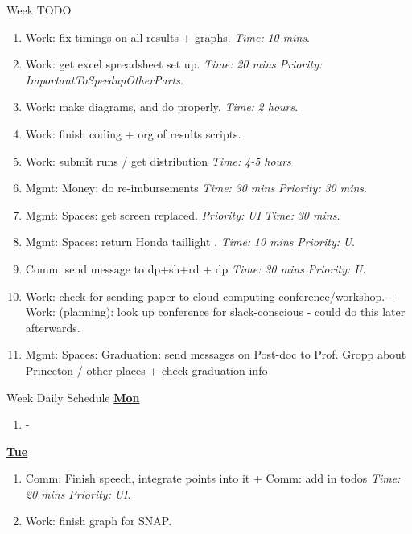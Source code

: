 \documentclass[serif, mathserif, final]{beamer}
\newcommand{\timeEst}[1]{\textit{Time:} \textit{#1}}
\newcommand{\priority}[1]{\textit{Priority:} \textit{#1}}
\begin{document}
\begin{frame}{}
\begin{columns}
\begin{column}{0.50\linewidth}
\begin{block}{Week TODO}
\begin{enumerate}
    \item \tiny Work: fix timings on all results + graphs. \timeEst{10 mins}. 
    \item \tiny Work: get excel spreadsheet set up. \timeEst{20 mins} \priority{ImportantToSpeedupOtherParts}. 

    \item \tiny Work: make diagrams, and do properly. \timeEst{2 hours}.  
    \item \tiny Work: finish coding + org of results scripts.
      \tiny \item \tiny Work: submit runs / get distribution \timeEst{4-5 hours}
    \item \tiny Mgmt: Money: do re-imbursements \timeEst{30 mins} \priority{30 mins}. 
    \item \tiny Mgmt: Spaces: get screen replaced. \priority{UI} \timeEst{30 mins}. 
    \item \tiny Mgmt: Spaces: return Honda taillight . \timeEst{10 mins} \priority{U}. 
    \item \tiny Comm: send message to dp+sh+rd   + dp \timeEst{30 mins} \priority{U}. 
    \item \tiny Work: check for sending paper to cloud computing
      conference/workshop. +  Work: (planning): look up conference for
      slack-conscious  - could do this later afterwards. 
    \item \tiny Mgmt: Spaces: Graduation: send messages on Post-doc to
      Prof. Gropp about Princeton / other places + check graduation info 
\end{enumerate}
\end{block} 


\begin{block}{Week Daily Schedule} 
\textbf{\small \underline{Mon}}
\begin{enumerate} 
\tiny \item \tiny -
\end{enumerate} 

\textbf{\small \underline{Tue}}
\begin{enumerate}
\tiny \item \tiny Comm: Finish speech, integrate points into it + Comm: add in todos  \timeEst{20 mins} \priority{UI}. 
\item \tiny Work: finish graph for SNAP. 
\end{enumerate} 


\end{block}
\end{column}
\end{columns}
\end{frame}
\end{document}
